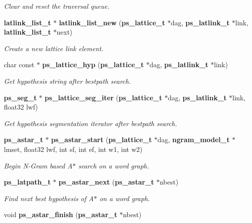 \begin{DoxyCompactItemize}
\begin{DoxyCompactList}\small\item\em Clear and reset the traversal queue. \end{DoxyCompactList}\item 
{\bf latlink\-\_\-list\-\_\-t} $\ast$ {\bf latlink\-\_\-list\-\_\-new} ({\bf ps\-\_\-lattice\-\_\-t} $\ast$dag, {\bf ps\-\_\-latlink\-\_\-t} $\ast$link, {\bf latlink\-\_\-list\-\_\-t} $\ast$next)\label{ps__lattice__internal_8h_a7197508af770064ea825bb812dd6eddc}

\begin{DoxyCompactList}\small\item\em Create a new lattice link element. \end{DoxyCompactList}\item 
char const $\ast$ {\bf ps\-\_\-lattice\-\_\-hyp} ({\bf ps\-\_\-lattice\-\_\-t} $\ast$dag, {\bf ps\-\_\-latlink\-\_\-t} $\ast$link)\label{ps__lattice__internal_8h_a02b07c009d23b852bd4db54700dfac5b}

\begin{DoxyCompactList}\small\item\em Get hypothesis string after bestpath search. \end{DoxyCompactList}\item 
{\bf ps\-\_\-seg\-\_\-t} $\ast$ {\bf ps\-\_\-lattice\-\_\-seg\-\_\-iter} ({\bf ps\-\_\-lattice\-\_\-t} $\ast$dag, {\bf ps\-\_\-latlink\-\_\-t} $\ast$link, float32 lwf)\label{ps__lattice__internal_8h_afedbc5558c18f7d029e84a4e27e38187}

\begin{DoxyCompactList}\small\item\em Get hypothesis segmentation iterator after bestpath search. \end{DoxyCompactList}\item 
{\bf ps\-\_\-astar\-\_\-t} $\ast$ {\bf ps\-\_\-astar\-\_\-start} ({\bf ps\-\_\-lattice\-\_\-t} $\ast$dag, {\bf ngram\-\_\-model\-\_\-t} $\ast$lmset, float32 lwf, int sf, int ef, int w1, int w2)
\begin{DoxyCompactList}\small\item\em Begin N-\/\-Gram based A$\ast$ search on a word graph. \end{DoxyCompactList}\item 
{\bf ps\-\_\-latpath\-\_\-t} $\ast$ {\bf ps\-\_\-astar\-\_\-next} ({\bf ps\-\_\-astar\-\_\-t} $\ast$nbest)
\begin{DoxyCompactList}\small\item\em Find next best hypothesis of A$\ast$ on a word graph. \end{DoxyCompactList}\item 
void {\bf ps\-\_\-astar\-\_\-finish} ({\bf ps\-\_\-astar\-\_\-t} $\ast$nbest)\label{ps__lattice__internal_8h_abfb03e9e0fcbe3def45120f5ba43be14}


\end{DoxyCompactItemize}
